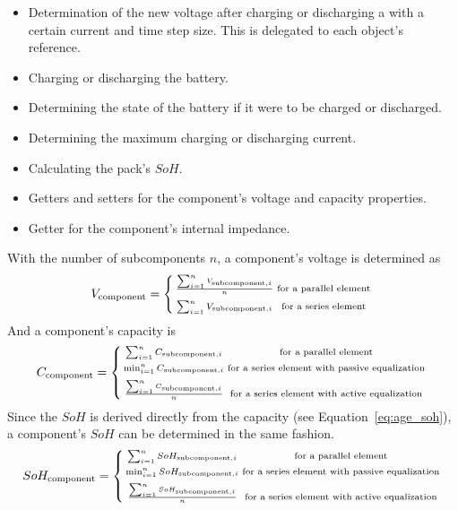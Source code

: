\begin{itemize}
	\item Determination of the new voltage after charging or discharging a with a certain current and time step size. This is delegated to each  object's  reference.
	\item Charging or discharging the battery.
	\item Determining the state of the battery if it were to be charged or discharged.
	\item Determining the maximum charging or discharging current.
	\item Calculating the pack's $SoH$.
	\item Getters and setters for the component's voltage and capacity properties.
	\item Getter for the component's internal impedance. 
\end{itemize}
With the number of subcomponents $n$, a component's voltage is determined as
\begin{equation} 
V_\text{component} = \left\lbrace
\begin{smallmatrix}
\frac{\sum_{i=1}^{n}V_{\text{subcomponent}, i}}{n} & \text{for a parallel element}\\
& \\
\sum_{i=1}^{n}V_{\text{subcomponent}, i} & \text{for a series element} \\
\end{smallmatrix}
\right.
\end{equation}
And a component's capacity is
\begin{equation}
C_\text{component} = \left\lbrace
\begin{smallmatrix}
\sum_{i=1}^{n}C_{\text{subcomponent}, i} & \text{for a parallel element}\\
& \\
\min_{i=1}^{n}C_{\text{subcomponent}, i} & \text{for a series element with passive equalization} \\
& \\
\frac{\sum_{i=1}^{n}C_{\text{subcomponent}, i}}{n} & \text{for a series element with active equalization}\\
\end{smallmatrix}
\right.
\end{equation}
Since the $SoH$ is derived directly from the capacity (see Equation~\ref{eq:age_soh}), a component's $SoH$ can be determined in the same fashion.
\begin{equation}
SoH_\text{component} = \left\lbrace
\begin{smallmatrix}
\sum_{i=1}^{n}SoH_{\text{subcomponent}, i} & \text{for a parallel element}\\
& \\
\min_{i=1}^{n}SoH_{\text{subcomponent}, i} & \text{for a series element with passive equalization} \\
& \\
\frac{\sum_{i=1}^{n}SoH_{\text{subcomponent}, i}}{n} & \text{for a series element with active equalization}\\
\end{smallmatrix}
\right.
\end{equation}
